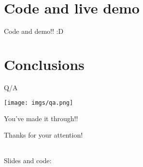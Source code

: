 \documentclass[10pt]{beamer}
\begin{document}
	
	\section{Code and live demo}
	
	\begin{frame}{Code and demo!! :D}
	\begin{center}
	\href{http://localhost:8888/notebooks/notebooks/Pycon9_MarkovChains.ipynb}{}
	\end{center}
	\end{frame}
	
	
	\section{Conclusions}
	
	\begin{frame}{Q/A}
		\begin{center}
		\texttt{[image: imgs/qa.png]}
		\end{center}
	\end{frame}	
	
	
	\begin{frame}{You've made it through!!}
		\begin{center}
		\Huge{Thanks for your attention!\\}
		\footnotesize\href{mailto:pietro_mascolo@optum.com}{}\\
		\vspace{0.2cm}
		\footnotesize \href{https://twitter.com/iz4vve}{}

		\vspace{1.5cm}
		\small
		Slides and code:
		\href{http://bit.ly/2H8giAW}{  }
		\end{center}
	\end{frame}
\end{document}
